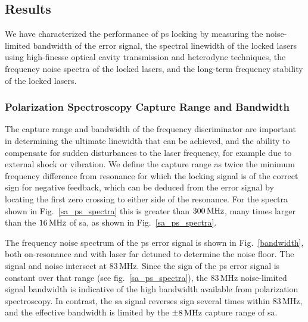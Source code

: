 \subsection{Results} \label{results_section}

We have characterized the performance of \gls*{ps} locking by measuring the noise-limited bandwidth of the error signal, the spectral linewidth of the locked lasers using high-finesse optical cavity transmission and heterodyne techniques, the frequency noise spectra of the locked lasers, and the long-term frequency stability of the locked lasers.

\subsubsection{Polarization Spectroscopy Capture Range and Bandwidth}\label{bandwidth_section}
The capture range and bandwidth of the frequency discriminator are important in determining the ultimate linewidth that can be achieved, and the ability to compensate for sudden disturbances to the laser frequency, for example due to external shock or vibration.
We define the capture range as twice the minimum frequency difference from resonance for which the locking signal is of the correct sign for negative feedback, which can be deduced from the error signal by locating the first zero crossing to either side of the resonance. For the spectra shown in Fig.~\ref{sa_ps_spectra} this is greater than $300\rm\,MHz$, many times larger than the $16\rm\,MHz$ of \gls*{sa}, as shown in Fig.~\ref{sa_ps_spectra}.

The frequency noise spectrum of the \gls*{ps} error signal is shown in  Fig.~\ref{bandwidth}, both on-resonance and with laser far detuned to determine the noise floor.  The signal and noise intersect at 83\,MHz.  Since the sign of the \gls*{ps} error signal is constant over that range (see fig.~\ref{sa_ps_spectra}), the 83\,MHz noise-limited signal bandwidth is indicative of the high bandwidth available from polarization spectroscopy.  In contrast, the \gls*{sa} signal reverses sign several times within 83\,MHz, and the effective bandwidth is limited by the $\pm 8\rm\,MHz$ capture range of \gls*{sa}.

